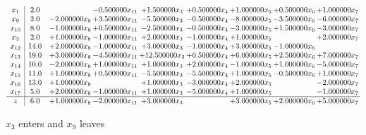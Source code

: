 \documentclass[10pt]{article}
\begin{document}
 \[\begin{array}{c| c c@{\hskip 2pt} c@{\hskip 2pt} c@{\hskip 2pt} c@{\hskip 2pt} c@{\hskip 2pt} c@{\hskip 2pt} c@{\hskip 2pt} }
 x_{1}   &  2.0  &   & -0.500000 x_{11} & + 1.500000 x_{3} & + 0.500000 x_{4} & + 1.000000 x_{5} & + 0.500000 x_{6} & + 1.000000 x_{7}\\
 x_{9}   &  2.0 & -2.000000 x_{8} & + 3.500000 x_{11} & -5.500000 x_{3} & -0.500000 x_{4} & -8.000000 x_{5} & -3.500000 x_{6} & -6.000000 x_{7}\\
 x_{10}   &  8.0 & -1.000000 x_{8} & + 0.500000 x_{11} & -2.500000 x_{3} & -0.500000 x_{4} & -3.000000 x_{5} & + 1.500000 x_{6} & -3.000000 x_{7}\\
 x_{2}   &  2.0 & + 1.000000 x_{8} & -1.000000 x_{11} & + 2.000000 x_{3} & -1.000000 x_{4} & + 1.000000 x_{5} &   & + 2.000000 x_{7}\\
 x_{12}   &  14.0 & + 2.000000 x_{8} & -1.000000 x_{11} & + 3.000000 x_{3} & -1.000000 x_{4} & + 3.000000 x_{5} & -1.000000 x_{6} &   \\
 x_{13}   &  19.0 & + 3.000000 x_{8} & -4.500000 x_{11} & + 12.500000 x_{3} & + 0.500000 x_{4} & + 6.000000 x_{5} & + 2.500000 x_{6} & + 7.000000 x_{7}\\
 x_{14}   &  10.0 & -2.000000 x_{8} & + 1.000000 x_{11} & + 1.000000 x_{3} & + 2.000000 x_{4} & -1.000000 x_{5} & + 1.000000 x_{6} & -5.000000 x_{7}\\
 x_{15}   &  11.0 & + 1.000000 x_{8} & + 0.500000 x_{11} & -5.500000 x_{3} & -5.500000 x_{4} & + 1.000000 x_{5} & -0.500000 x_{6} & + 1.000000 x_{7}\\
 x_{16}   &  13.0 & + 1.000000 x_{8} &   & + 1.000000 x_{3} & -3.000000 x_{4} & + 2.000000 x_{5} &   & -2.000000 x_{7}\\
 x_{17}   &  5.0 & + 2.000000 x_{8} & -1.000000 x_{11} & + 1.000000 x_{3} & -5.000000 x_{4} & + 1.000000 x_{5} &   & -1.000000 x_{7}\\
\hline
z    &  6.0 & + 1.000000 x_{8} & -2.000000 x_{11} & + 3.000000 x_{3} &   & + 3.000000 x_{5} & + 2.000000 x_{6} & + 5.000000 x_{7}\\
\end{array}\]


 $ x_{3} $ enters and $ x_{9} $ leaves 
\end{document}

